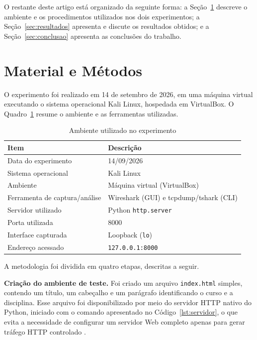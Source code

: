 \documentclass[12pt]{article}
\begin{document}
O restante deste artigo está organizado da seguinte forma: a
Seção~\ref{sec:metodo} descreve o ambiente e os procedimentos utilizados
nos dois experimentos; a Seção~\ref{sec:resultados} apresenta e discute os
resultados obtidos; e a Seção~\ref{sec:conclusao} apresenta as conclusões
do trabalho.

\section{Material e Métodos}\label{sec:metodo}

O experimento foi realizado em 14 de setembro de 2026, em uma máquina
virtual executando o sistema operacional Kali Linux, hospedada em
VirtualBox. O Quadro~\ref{tab:ambiente} resume o ambiente e as ferramentas
utilizadas.

\begin{table}[ht]
\centering
\caption{Ambiente utilizado no experimento}
\label{tab:ambiente}
\begin{tabular}{|l|l|}
\hline
\textbf{Item} & \textbf{Descrição} \\
\hline
Data do experimento & 14/09/2026 \\
\hline
Sistema operacional & Kali Linux \\
\hline
Ambiente & Máquina virtual (VirtualBox) \\
\hline
Ferramenta de captura/análise & Wireshark (GUI) e tcpdump/tshark (CLI) \\
\hline
Servidor utilizado & Python \texttt{http.server} \\
\hline
Porta utilizada & 8000 \\
\hline
Interface capturada & Loopback (\texttt{lo}) \\
\hline
Endereço acessado & \texttt{127.0.0.1:8000} \\
\hline
\end{tabular}
\end{table}

A metodologia foi dividida em quatro etapas, descritas a seguir.

\textbf{Criação do ambiente de teste.} Foi criado um arquivo
\texttt{index.html} simples, contendo um título, um cabeçalho e um
parágrafo identificando o curso e a disciplina. Esse arquivo foi
disponibilizado por meio do servidor HTTP nativo do Python, iniciado com o
comando apresentado no Código~\ref{lst:servidor}, o que evita a necessidade
de configurar um servidor Web completo apenas para gerar tráfego HTTP
controlado \cite{python-http-server}.
\end{document}
